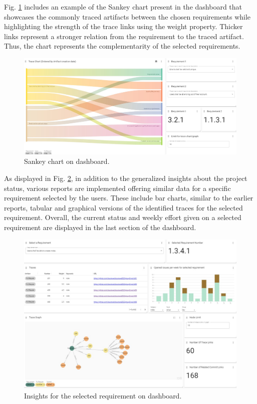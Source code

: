 Fig. \ref{fig:sankey} includes an example of the Sankey chart present in the dashboard that showcases the commonly traced artifacts between the chosen requirements while highlighting the strength of the trace links using the weight property. Thicker links represent a stronger relation from the requirement to the traced artifact. Thus, the chart represents the complementarity of the selected requirements.

\begin{figure}[htb]
    \centering
    \includegraphics[width=0.9\linewidth]{figs/sankey.jpg}
    \caption{Sankey chart on dashboard.}
    \label{fig:sankey}
\end{figure}

As displayed in Fig. \ref{fig:perreq}, in addition to the generalized insights about the project status, various reports are implemented offering similar data for a specific requirement selected by the users. These include bar charts, similar to the earlier reports, tabular and graphical versions of the identified traces for the selected requirement. Overall, the current status and weekly effort given on a selected requirement are displayed in the last section of the dashboard.

\begin{figure}[htb]
    \centering
    \includegraphics[width=0.9\linewidth]{figs/perreq.jpg}
    \caption{Insights for the selected requirement on dashboard.}
    \label{fig:perreq}
\end{figure}
